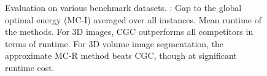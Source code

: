 \begin{center}
\begin{figure}



    \caption[Evaluation of CGC on 3D datasets]{ \label{fig:experiments-cgc-3d}
    Evaluation on various benchmark datasets.
     : Gap to the global optimal energy (MC-I) averaged over all instances.
     Mean runtime of the methods.
    For 3D images,
    CGC outperforms all competitors in terms of runtime.
    For 3D volume image segmentation,
    the approximate MC-R method beats CGC, though at significant 
    runtime cost.
    }
\end{figure}
\end{center}




